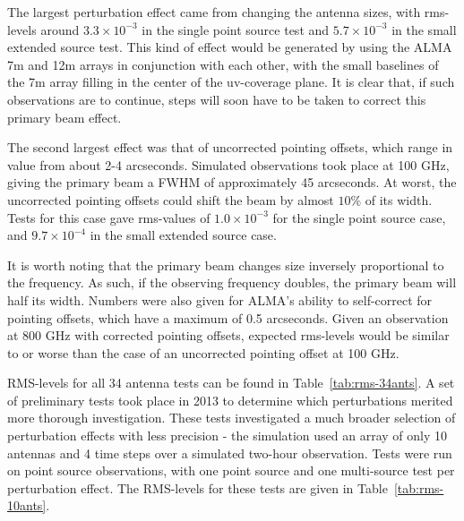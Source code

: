\documentclass[11pt]{article}
\begin{document}
The largest perturbation effect came from changing the antenna sizes, with 
rms-levels around $ 3.3 \times 10^{-3}$ in the single point source test and 
$5.7 \times 10^{-3}$ in the small extended source test. This kind of effect 
would be generated by using the ALMA 7m and 12m arrays in conjunction with each 
other, with the small baselines of the 7m array filling in the center of the 
uv-coverage plane.  It is clear that, if such observations are to continue, 
steps will soon have to be taken to correct this primary beam effect.

The second largest effect was that of uncorrected pointing offsets, which
range in value from about 2-4 arcseconds. Simulated observations took place
at 100 GHz, giving the primary beam a FWHM of approximately 45 arcseconds.
At worst, the uncorrected pointing offsets could shift the beam by almost
$10\%$ of its width. Tests for this case gave rms-values of $1.0 \times 
10^{-3}$ for the single point source case, and $9.7 \times 10^{-4}$ in the 
small extended source case.

It is worth noting that the primary beam changes size inversely proportional
to the frequency. As such, if the observing frequency doubles, the primary
beam will half its width. Numbers were also given for ALMA's ability to
self-correct for pointing offsets, which have a maximum of 0.5 arcseconds.
Given an observation at 800 GHz with corrected pointing offsets, expected 
rms-levels would be similar to or worse than the case of an uncorrected 
pointing offset at 100 GHz.

RMS-levels for all 34 antenna tests can be found in Table~\ref{tab:rms-34ants}.  
A set of preliminary tests took place in 2013 to determine which perturbations 
merited more thorough investigation. These tests investigated a much broader 
selection of perturbation effects with less precision - the simulation used an 
array of only 10 antennas and 4 time steps over a simulated two-hour 
observation. Tests were run on point source observations, with one point source 
and one multi-source test per perturbation effect. The RMS-levels for these 
tests are given in Table~\ref{tab:rms-10ants}.
\end{document}
